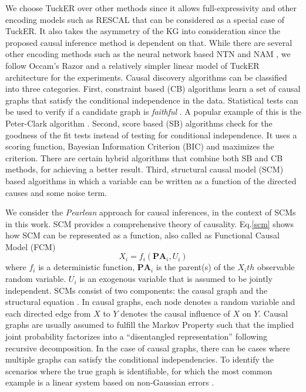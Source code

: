 \documentclass{article}
\begin{document}
We choose TuckER over other methods since it allows full-expressivity and other encoding models such as RESCAL that can be considered as a special case of TuckER. It also takes the asymmetry of the KG into consideration since the proposed causal inference method is dependent on that. While there are several other encoding methods such as the neural network based NTN \cite{NTN} and NAM \cite{liu2016probabilistic}, we follow Occam's Razor and a relatively simpler linear model of TuckER architecture for the experiments. Causal discovery algorithms can be classified into three categories. First, constraint based (CB) algorithms learn a set of causal graphs that satisfy the conditional independence in the data. Statistical tests can be used to verify if a candidate graph is \textit{faithful} \cite{spirtes2000causation}. A popular example of this is the Peter-Clark algorithm \cite{spirtes2000causation}. Second, score based (SB) algorithms check for the goodness of the fit tests instead of testing for conditional independence. It uses a scoring function, Bayesian Information Criterion (BIC) \cite{schwarz1978estimating} and maximizes the criterion. There are certain hybrid algorithms that combine both SB and CB methods, for achieving a better result. Third, structural causal model (SCM) based algorithms in which a variable can be written as a function of the directed causes and some noise term.

We consider the \textit{Pearlean} \cite{Pearl2009} approach for causal inferences, in the context of SCMs \cite{Pearl2009} in this work. SCM provides a comprehensive theory of causality. Eq.\eqref{scm} shows how SCM can be represented as a function, also called as Functional Causal Model (FCM)
\begin{equation}
\label{scm}
    X_i = f_i(\textbf{PA}_i, U_i) 
\end{equation}
where $f_i$ is a deterministic function, $\textbf{PA}_i$ is the parent(s) of the $X_ith$ observable random variable. $U_i$ is an exogenous variable that is assumed to be jointly independent.
SCMs consist of two components: the causal graph and the structural equation \cite{bollen1998interactions}. In causal graphs, each node denotes a random variable and each directed edge from $X$ to $Y$ denotes the causal influence of $X$ on $Y$. Causal graphs are usually assumed to fulfill the Markov Property such that the implied joint probability factorizes into a “disentangled representation” following recursive decomposition. In the case of causal graphs, there can be cases where multiple graphs can satisfy the conditional independencies. To identify the scenarios where the true graph is identifiable, for which the most common example is a linear system based on non-Gaussian errors \cite{JMLR:v7:shimizu06a}.
\end{document}
